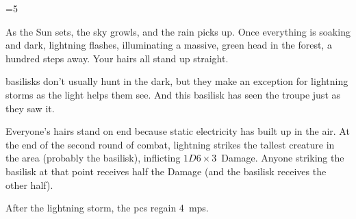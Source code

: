 \ifnum\value{cycle}=5


\begin{boxtext}
  As the Sun sets, the sky growls, and the rain picks up.
  Once everything is soaking and dark, lightning flashes, illuminating a massive, green head in the forest, a hundred \glspl{step} away.
  Your hairs all stand up straight.
\end{boxtext}

\Glspl{basilisk} don't usually hunt in the dark, but they make an exception for lightning storms as the light helps them see.
And this \gls{basilisk} has seen the troupe just as they saw it.

Everyone's hairs stand on end because static electricity has built up in the air.
At the end of the second \gls{round} of combat, lightning strikes the tallest creature in the area (probably the \gls{basilisk}), inflicting $1D6\times 3$~Damage.
Anyone striking the \gls{basilisk} at that point receives half the Damage (and the \gls{basilisk} receives the other half).

\basilisk

After the lightning storm, the \glspl{pc} regain 4~\glspl{mp}.

\fi
